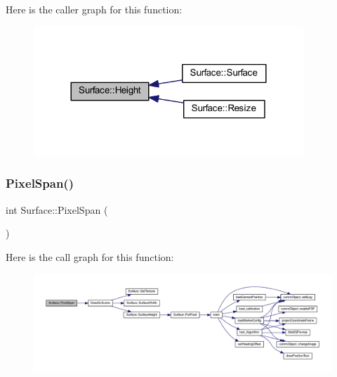 Here is the caller graph for this function\+:\nopagebreak
\begin{figure}[H]
\begin{center}
\leavevmode
\includegraphics[width=288pt]{class_surface_ab901f48d51b3fd427415b580dc15518c_icgraph}
\end{center}
\end{figure}
\mbox{\label{class_surface_abe0d542404575c60911d6ad4219560f9}} 
\subsubsection{\texorpdfstring{Pixel\+Span()}{PixelSpan()}}
{\footnotesize\ttfamily int Surface\+::\+Pixel\+Span (\begin{DoxyParamCaption}{ }\end{DoxyParamCaption})\hspace{0.3cm}{\ttfamily [inline]}}

Here is the call graph for this function\+:\nopagebreak
\begin{figure}[H]
\begin{center}
\leavevmode
\includegraphics[width=350pt]{class_surface_abe0d542404575c60911d6ad4219560f9_cgraph}
\end{center}
\end{figure}
\mbox{\label{class_surface_a728571d0386e9690ce1760931562c72b}} 
